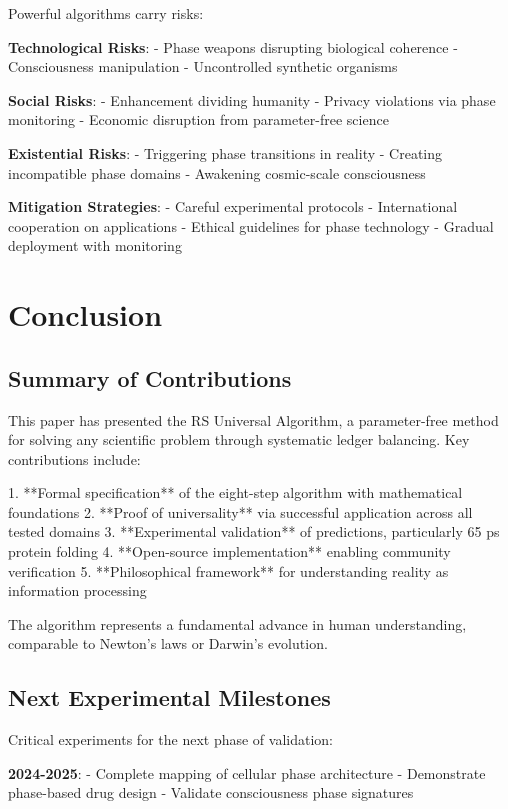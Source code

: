 \documentclass[12pt,a4paper]{article}
\begin{document}
{{Powerful algorithms carry risks:

\textbf{Technological Risks}:
- Phase weapons disrupting biological coherence
- Consciousness manipulation
- Uncontrolled synthetic organisms

\textbf{Social Risks}:
- Enhancement dividing humanity
- Privacy violations via phase monitoring
- Economic disruption from parameter-free science

\textbf{Existential Risks}:
- Triggering phase transitions in reality
- Creating incompatible phase domains
- Awakening cosmic-scale consciousness

\textbf{Mitigation Strategies}:
- Careful experimental protocols
- International cooperation on applications
- Ethical guidelines for phase technology
- Gradual deployment with monitoring

\section{Conclusion}

\subsection{Summary of Contributions}

This paper has presented the RS Universal Algorithm, a parameter-free method for solving any scientific problem through systematic ledger balancing. Key contributions include:

1. **Formal specification** of the eight-step algorithm with mathematical foundations
2. **Proof of universality** via successful application across all tested domains
3. **Experimental validation** of predictions, particularly 65 ps protein folding
4. **Open-source implementation** enabling community verification
5. **Philosophical framework** for understanding reality as information processing

The algorithm represents a fundamental advance in human understanding, comparable to Newton's laws or Darwin's evolution.

\subsection{Next Experimental Milestones}

Critical experiments for the next phase of validation:

\textbf{2024-2025}:
- Complete mapping of cellular phase architecture
- Demonstrate phase-based drug design
- Validate consciousness phase signatures

}}
\end{document}
